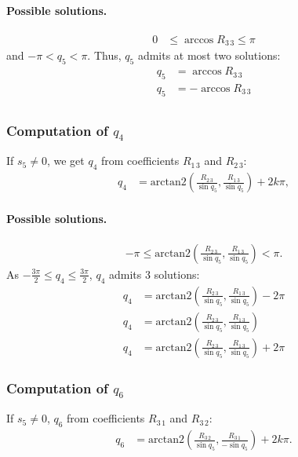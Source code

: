 \documentclass{article}
\begin{document}
\paragraph{Possible solutions.}

\begin{align*}
  0 &\leq \arccos R_{3\,3} \leq \pi
\end{align*}
and $-\pi < q_5 < \pi$. Thus, $q_5$ admits at most two solutions:
\begin{align*}
  q_5 &= \arccos R_{3\,3}\\
  q_5 &= -\arccos R_{3\,3}\\
\end{align*}

\subsubsection*{Computation of $q_4$}

If $s_5\not=0$, we get $q_4$ from  coefficients $R_{1\,3}$ and $R_{2\,3}$:
\begin{align*}
  q_4 &= \mbox{arctan2}(\frac{R_{2\,3}}{\sin q_5}, \frac{R_{1\,3}}{\sin q_5}) + 2k\pi,
\end{align*}

\paragraph{Possible solutions.}

\begin{align*}
  -\pi \leq \mbox{arctan2}(\frac{R_{2\,3}}{\sin q_5}, \frac{R_{1\,3}}{\sin q_5}) < \pi.
\end{align*}
As $-\frac{3\pi}{2} \leq q_4 \leq \frac{3\pi}{2}$, $q_4$ admits 3 solutions:
\begin{align*}
  q_4 &= \mbox{arctan2}(\frac{R_{2\,3}}{\sin q_5}, \frac{R_{1\,3}}{\sin q_5}) -2\pi \\
  q_4 &= \mbox{arctan2}(\frac{R_{2\,3}}{\sin q_5}, \frac{R_{1\,3}}{\sin q_5}) \\
  q_4 &= \mbox{arctan2}(\frac{R_{2\,3}}{\sin q_5}, \frac{R_{1\,3}}{\sin q_5}) + 2\pi
\end{align*}

\subsubsection*{Computation of $q_6$}

If $s_5\not=0$, $q_6$ from coefficients $R_{3\,1}$ and $R_{3\,2}$:
\begin{align*}
  q_6 &= \mbox{arctan2}(\frac{R_{3\,2}}{\sin q_5}, \frac{R_{3\,1}}{-\sin q_5}) + 2k\pi.
\end{align*}
\end{document}
